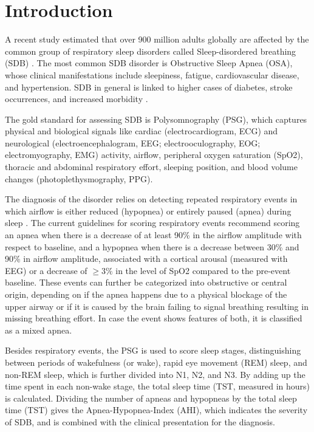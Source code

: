 \chapter{Introduction \label{Chapter-Intro}}

A recent study estimated that over 900 million adults globally are affected by the common group of respiratory sleep disorders called Sleep-disordered breathing (SDB) \cite{benjafield2019estimation}. The most common SDB disorder is Obstructive Sleep Apnea (OSA), whose clinical manifestations include sleepiness, fatigue, cardiovascular disease, and hypertension. SDB in general is linked to higher cases of diabetes, stroke occurrences, and increased morbidity \cite{dempsey2010dempsey,patil2007adult,young2002epidemiology}.

The gold standard for assessing SDB is Polysomnography (PSG), which captures physical and biological signals like cardiac (electrocardiogram, ECG) and neurological (electroencephalogram, EEG; electrooculography, EOG; electromyography, EMG) activity, airflow, peripheral oxygen saturation (SpO2), thoracic and abdominal respiratory effort, sleeping position, and blood volume changes (photoplethysmography, PPG).

The diagnosis of the disorder relies on detecting repeated respiratory events in which airflow is either reduced (hypopnea) or entirely paused (apnea) during sleep \cite{dempsey2010dempsey,gould2012sleep}.
The current guidelines for scoring respiratory events \cite{troester2023aasm} recommend scoring an apnea when there is a decrease of at least 90\% in the airflow amplitude with respect to baseline, and a hypopnea when there is a decrease between 30\% and 90\% in airflow amplitude, associated with a cortical arousal (measured with EEG) or a decrease of $\geq 3\%$ in the level of SpO2 compared to the pre-event baseline.
These events can further be categorized into obstructive or central origin, depending on if the apnea happens due to a physical blockage of the upper airway or if it is caused by the brain failing to signal breathing resulting in missing breathing effort. In case the event shows features of both, it is classified as a mixed apnea.

Besides respiratory events, the PSG is used to score sleep stages, distinguishing between periods of wakefulness (or wake), rapid eye movement (REM) sleep, and non-REM sleep, which is further divided into N1, N2, and N3. By adding up the time spent in each non-wake stage, the total sleep time (TST, measured in hours) is calculated. Dividing the number of apneas and hypopneas by the total sleep time (TST) gives the Apnea-Hypopnea-Index (AHI), which indicates the severity of SDB, and is combined with the clinical presentation for the diagnosis.

